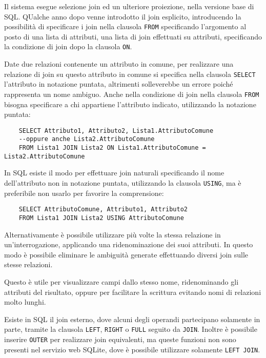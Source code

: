 \documentclass{article}
\numberwithin{equation}{subsection}
\begin{document}
Il sistema esegue selezione join ed un ulteriore proiezione, nella versione base di SQL. QUalche anno dopo venne introdotto il join esplicito, 
introducendo la possibilità di specificare i join nella clausola \verb|FROM| specificando l'argomento al posto di una lista di attributi, una lista 
di join effettuati su attributi, specificando la condizione di join dopo la clausola \verb|ON|. 

Date due relazioni contenente un attributo in comune, per realizzare una relazione di join su questo attributo in comune si specifica nella 
clausola \verb|SELECT| l'attributo in notazione puntata, altrimenti solleverebbe un errore poiché rappresenta un nome ambiguo. Anche nella 
condizione di join nella clausola \verb|FROM| bisogna specificare a chi appartiene l'attributo indicato, utilizzando la notazione puntata: 

\begin{verbatim}
    SELECT Attributo1, Attributo2, Lista1.AttributoComune 
    --oppure anche Lista2.AttributoComune
    FROM Lista1 JOIN Lista2 ON Lista1.AttributoComune = Lista2.AttributoComune
\end{verbatim}

In SQL esiste il modo per effettuare join naturali specificando il nome dell'attributo non in notazione puntata, utilizzando la clausola \verb|USING|, 
ma è preferibile non usarlo per favorire la comprensione:

\begin{verbatim}
    SELECT AttributoComune, Attributo1, Attributo2
    FROM Lista1 JOIN Lista2 USING AttributoComune
\end{verbatim}

Alternativamente è possibile utilizzare più volte la stessa relazione in un'interrogazione, applicando una ridenominazione dei suoi attributi. In questo modo è possibile eliminare le ambiguità generate effettuando diversi 
join sulle stesse relazioni. 

Questo è utile per visualizzare campi dallo stesso nome, ridenominando gli attributi del risultato, oppure per facilitare la scrittura 
evitando nomi di relazioni molto lunghi. 

Esiste in SQL il join esterno, dove alcuni degli operandi partecipano solamente in parte, tramite la clausola \verb|LEFT|, \verb|RIGHT| o \verb|FULL| 
seguito da \verb|JOIN|. Inoltre è possibile inserire \verb|OUTER| per realizzare join equivalenti, ma queste funzioni non sono presenti nel servizio web SQLite, dove 
è possibile utilizzare solamente \verb|LEFT JOIN|. 
\end{document}
